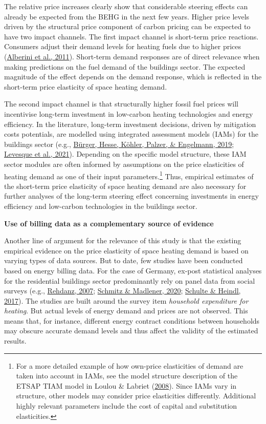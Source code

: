\documentclass[12pt,twoside]{reedthesis}
\begin{document}
The relative price increases clearly show that considerable steering effects can already be expected from the BEHG in the next few years. Higher price levels driven by the structural price component of carbon pricing can be expected to have two impact channels. The first impact channel is short-term price reactions. Consumers adjust their demand levels for heating fuels due to higher prices (\protect\hyperlink{ref-alberini_etal11}{Alberini et al., 2011}). Short-term demand responses are of direct relevance when making predictions on the fuel demand of the buildings sector. The expected magnitude of the effect depends on the demand response, which is reflected in the short-term price elasticity of space heating demand.

The second impact channel is that structurally higher fossil fuel prices will incentivise long-term investment in low-carbon heating technologies and energy efficiency. In the literature, long-term investment decisions, driven by mitigation costs potentials, are modelled using integrated assessment models (IAMs) for the buildings sector (e.g., \protect\hyperlink{ref-burger_etal19}{Bürger, Hesse, Köhler, Palzer, \& Engelmann, 2019}; \protect\hyperlink{ref-levesque_etal21}{Levesque et al., 2021}). Depending on the specific model structure, these IAM sector modules are often informed by assumptions on the price elasticities of heating demand as one of their input parameters.\footnote{For a more detailed example of how own-price elasticities of demand are taken into account in IAMs, see the model structure description of the ETSAP TIAM model in Loulou \& Labriet (\protect\hyperlink{ref-loulou_labriet08}{2008}). Since IAMs vary in structure, other models may consider price elasticities differently. Additional highly relevant parameters include the cost of capital and substitution elasticities.} Thus, empirical estimates of the short-term price elasticity of space heating demand are also necessary for further analyses of the long-term steering effect concerning investments in energy efficiency and low-carbon technologies in the buildings sector.

\textbf{Use of billing data as a complementary source of evidence}

Another line of argument for the relevance of this study is that the existing empirical evidence on the price elasticity of space heating demand is based on varying types of data sources. But to date, few studies have been conducted based on energy billing data. For the case of Germany, ex-post statistical analyses for the residential buildings sector predominantly rely on panel data from social surveys (e.g., \protect\hyperlink{ref-rehdanz07}{Rehdanz, 2007}; \protect\hyperlink{ref-schmitz_madlener20}{Schmitz \& Madlener, 2020}; \protect\hyperlink{ref-schulte_heindl17}{Schulte \& Heindl, 2017}). The studies are built around the survey item \emph{household expenditure for heating}. But actual levels of energy demand and prices are not observed. This means that, for instance, different energy contract conditions between households may obscure accurate demand levels and thus affect the validity of the estimated results.
\end{document}

